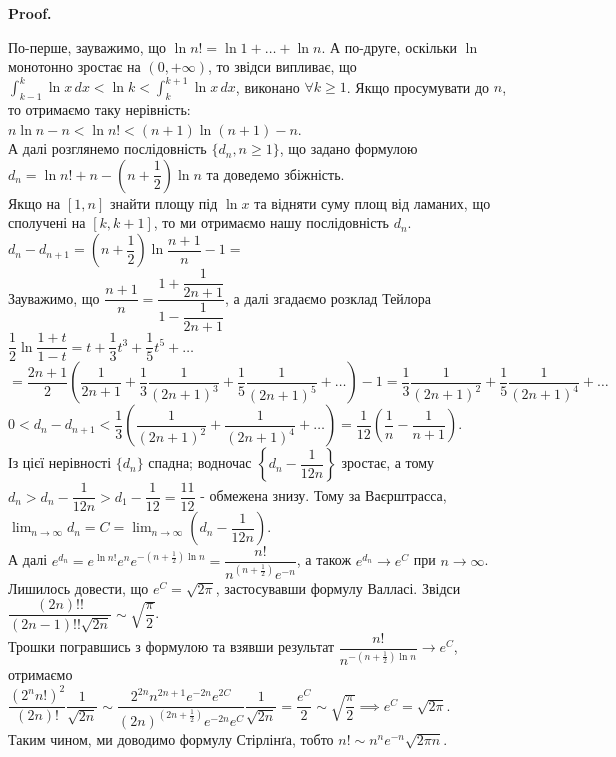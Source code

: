\documentclass[a4paper, 10pt]{article}
\makeatletter
\def\huge{\displaystyle}
\theoremstyle{theoremdd}
\theoremstyle{theoremdd}
\theoremstyle{theoremdd}
\theoremstyle{theoremdd}
\theoremstyle{theoremdd}
\theoremstyle{theoremdd}
\theoremstyle{theoremdd}
\theoremstyle{theoremdd}
\theoremstyle{theoremdd}
\renewenvironment{proof}[1][Proof.\\]{\par
\pushQED{\hfill \qed}%
\normalfont \topsep6\p@\@plus6\p@\relax
\trivlist
\item\relax
{\bfseries
#1\@addpunct{.}}\hspace\labelsep\ignorespaces
}{%
\popQED\endtrivlist\@endpefalse
}
\makeatother
\begin{document}
\begin{proof}
По-перше, зауважимо, що $\ln n! = \ln 1 + \dots + \ln n$. А по-друге, оскільки $\ln$ монотонно зростає на $(0,+\infty)$, то звідси випливає, що\\
$\huge\int_{k-1}^k \ln x\,dx < \ln k < \int_k^{k+1} \ln x\,dx$, виконано $\forall k \geq 1$.
Якщо просумувати до $n$, то отримаємо таку нерівність:\\
$n \ln n - n < \ln n! < (n+1) \ln (n+1) - n$.\\
А далі розглянемо послідовність $\{ d_n, n \geq 1\}$, що задано формулою $d_n = \ln n! + n - \left( n + \dfrac{1}{2} \right) \ln n$ та доведемо збіжність.\\
Якщо на $[1,n]$ знайти площу під $\ln x$ та відняти суму площ від ламаних, що сполучені на $[k,k+1]$, то ми отримаємо нашу послідовність $d_n$.\\
$d_n - d_{n+1} = \left( n + \dfrac{1}{2} \right) \ln \dfrac{n+1}{n} - 1 \boxed{=}$\\
Зауважимо, що $\dfrac{n+1}{n} = \dfrac{1+\dfrac{1}{2n+1}}{1-\dfrac{1}{2n+1}}$, а далі згадаємо розклад Тейлора $\dfrac{1}{2} \ln \dfrac{1+t}{1-t} = t + \dfrac{1}{3}t^3 + \dfrac{1}{5}t^5 + \dots$\\
$= \dfrac{2n+1}{2} \left( \dfrac{1}{2n+1} + \dfrac{1}{3} \dfrac{1}{(2n+1)^3} + \dfrac{1}{5} \dfrac{1}{(2n+1)^5} + \dots \right) - 1 = \dfrac{1}{3} \dfrac{1}{(2n+1)^2} + \dfrac{1}{5} \dfrac{1}{(2n+1)^4} + \dots$\\
$0 < d_n - d_{n+1} < \dfrac{1}{3} \left( \dfrac{1}{(2n+1)^2} + \dfrac{1}{(2n+1)^4} + \dots \right) = \dfrac{1}{12} \left( \dfrac{1}{n} - \dfrac{1}{n+1} \right)$.\\
Із цієї нерівності $\{d_n \}$ спадна; водночас $\left \{ d_n - \dfrac{1}{12n} \right\}$ зростає, а тому $d_n > d_n - \dfrac{1}{12n} > d_1 - \dfrac{1}{12} = \dfrac{11}{12}$ - обмежена знизу. Тому за Ваєрштрасса, $\huge\lim_{n \to \infty} d_n = C = \lim_{n \to \infty} \left( d_n - \dfrac{1}{12n} \right)$.\\
А далі $e^{d_n} = e^{\ln n!} e^n e^{-\left( n + \frac{1}{2} \right) \ln n} = \dfrac{n!}{n^{\left( n + \frac{1}{2} \right)} e^{-n}}$, а також $e^{d_n} \to e^C$ при $n \to \infty$.\\
Лишилось довести, що $e^C = \sqrt{2 \pi}$, застосувавши формулу Валласі. Звідси $\dfrac{(2n)!!}{(2n-1)!! \sqrt{2n}} \sim \sqrt{\dfrac{\pi}{2}}$.\\
Трошки погравшись з формулою та взявши результат $\dfrac{n!}{n^{-\left( n + \frac{1}{2} \right) \ln n}} \to e^C$, отримаємо \\ $\dfrac{(2^n n!)^2}{(2n)!} \dfrac{1}{\sqrt{2n}} \sim \dfrac{2^{2n} n^{2n+1} e^{-2n} e^{2C}}{(2n)^{\left(2n+ \frac{1}{2} \right)} e^{-2n} e^C} \dfrac{1}{\sqrt{2n}} = \dfrac{e^C}{2} \sim \sqrt{\dfrac{\pi}{2}} \implies e^C = \sqrt{2\pi}$.\\
Таким чином, ми доводимо формулу Стірлінґа, тобто $n! \sim n^n e^{-n} \sqrt{2\pi n}$.
\end{proof}
\fi
\newpage
\end{document}
